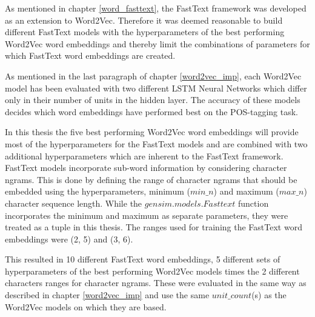 As mentioned in chapter \ref{word_fasttext}, the FastText framework was developed as an extension to Word2Vec. Therefore it was deemed reasonable to build different FastText models with the hyperparameters of the best performing Word2Vec word embeddings and thereby limit the combinations of parameters for which FastText word embeddings are created.

As mentioned in the last paragraph of chapter \ref{word2vec_imp}, each Word2Vec model has been evaluated with two different LSTM Neural Networks which differ only in their number of units in the hidden layer. The accuracy of these models decides which word embeddings have performed best on the POS-tagging task.

In this thesis the five best performing Word2Vec word embeddings will provide most of the hyperparameters for the FastText models and are combined with two additional hyperparameters which are inherent to the FastText framework. FastText models incorporate sub-word information by considering character ngrams. This is done by defining the range of character ngrams that should be embedded using the hyperparameters, minimum ($min\_n$) and maximum ($max\_n$) character sequence length. While the $gensim.models.Fasttext$ function incorporates the minimum and maximum as separate parameters, they were treated as a tuple in this thesis. The ranges used for training the FastText word embeddings were (2, 5) and (3, 6).

This resulted in 10 different FastText word embeddings, 5 different sets of hyperparameters of the best performing Word2Vec models times the 2 different characters ranges for character ngrams. These were evaluated in the same way as described in chapter \ref{word2vec_imp} and use the same $unit\_count$(s) as the Word2Vec models on which they are based.